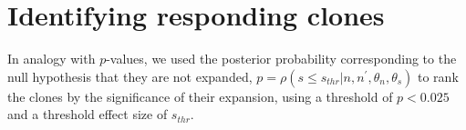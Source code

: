 \documentclass[letterpaper,english,prl,reprint,longbibliography]{revtex4-1} %
\begin{document}
\section{Identifying responding clones}
In analogy with $p$-values, we used the posterior probability corresponding to the null hypothesis that they are not expanded, $p=\rho(s\leq s_{thr}|n,n^{\prime},\theta_n,\theta_s)$ to rank the clones by the significance of their expansion, using a threshold of $p<0.025$ and a threshold effect size of $s_{thr}$. 




% 
% 
\end{document}
